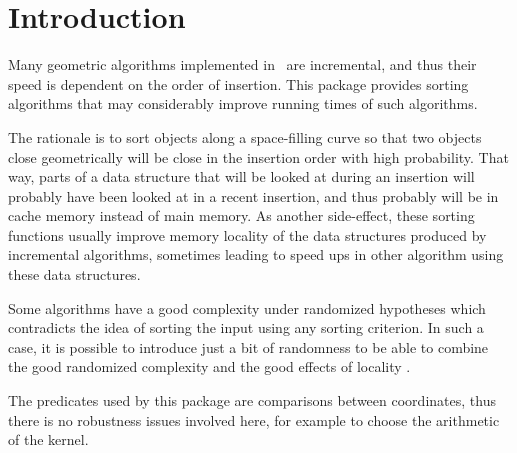 
\section{Introduction}

Many geometric algorithms implemented in \cgal\ are incremental, and thus their
speed is dependent on the order of insertion.  This package provides sorting
algorithms that may considerably improve running times of such
algorithms.

The rationale is to sort objects along a space-filling curve 
so that two
objects close geometrically will be close in the insertion order with high
probability.  That way, parts of a data structure that will be looked at during
an insertion will probably have been looked at in a recent insertion, and thus
probably will be in cache memory instead of main memory.
As another side-effect, these sorting functions usually improve memory locality
of the data structures produced by incremental algorithms, sometimes leading to
speed ups in other algorithm using these data structures.

Some algorithms have a good complexity under randomized hypotheses which
contradicts the idea of sorting the input using any sorting criterion.
In such a case, it is possible to introduce just a bit of randomness 
to be able to combine the good randomized complexity and the
good effects of locality \cite{acr-icb-03}.


The predicates used by this package are comparisons between coordinates,
thus there is no robustness issues involved here, for example to choose the
arithmetic of the kernel.



\begin{ccTexOnly}
\newpage
\end{ccTexOnly}


